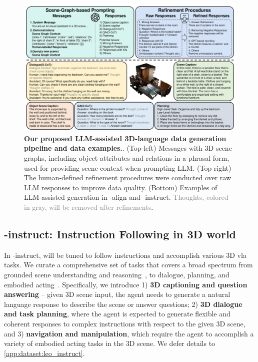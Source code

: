 \documentclass{article}
\begin{document}
\begin{figure}[t]
\centering
\includegraphics[width=\textwidth, keepaspectratio]{figs/data_framework_0131.pdf}%
  \caption{\textbf{Our proposed LLM-assisted 3D-language data generation pipeline and data examples.}. (Top-left) Messages with 3D scene graphs,
  including object attributes and relations in a phrasal form,
  used for providing scene context when prompting LLM.
  (Top-right) The human-defined refinement procedures were conducted over raw LLM responses to improve data quality.
  (Bottom) Examples of LLM-assisted generation in \agent-align and \agent-instruct. \textcolor{gray}{Thoughts, colored in gray, will be removed after refinements}.}
  \label{fig:data_framework}
  \vskip -0.15in
\end{figure}

\subsection{\agent-instruct: Instruction Following in 3D world}\label{sec:sft}
In \agent-instruct, \agent will be tuned to follow instructions and accomplish various 3D \ac{vla} tasks. We curate a comprehensive set of tasks that covers a broad spectrum from grounded scene understanding and reasoning~\citep{chen2021scan2cap, ma2023sqa3d}, to dialogue, planning, and embodied acting~\citep{savva2019habitat,cliport}. Specifically, we introduce 1) \textbf{3D captioning and question answering} -- given 3D scene input, the agent needs to generate a natural language response to describe the scene or answer questions; 2) \textbf{3D dialogue and task planning}, where the agent is expected to generate flexible and coherent responses to complex instructions with respect to the given 3D scene, and 3) \textbf{navigation and manipulation}, which require the agent to accomplish a variety of embodied acting tasks in the 3D scene. We defer details to \cref{app:dataset:leo_instruct}.
\end{document}
